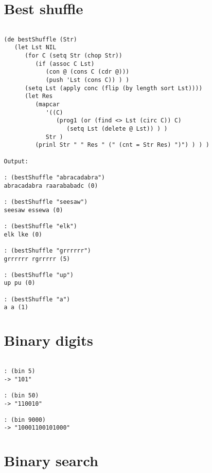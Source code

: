 \section*{Best shuffle}

\begin{verbatim}

(de bestShuffle (Str)
   (let Lst NIL
      (for C (setq Str (chop Str))
         (if (assoc C Lst)
            (con @ (cons C (cdr @)))
            (push 'Lst (cons C)) ) )
      (setq Lst (apply conc (flip (by length sort Lst))))
      (let Res
         (mapcar
            '((C)
               (prog1 (or (find <> Lst (circ C)) C)
                  (setq Lst (delete @ Lst)) ) )
            Str )
         (prinl Str " " Res " (" (cnt = Str Res) ")") ) ) )

Output:

: (bestShuffle "abracadabra")
abracadabra raarababadc (0)

: (bestShuffle "seesaw")
seesaw essewa (0)

: (bestShuffle "elk")
elk lke (0)

: (bestShuffle "grrrrrr")
grrrrrr rgrrrrr (5)

: (bestShuffle "up")
up pu (0)

: (bestShuffle "a")
a a (1)

\end{verbatim}

\section*{Binary digits}

\begin{verbatim}

: (bin 5)
-> "101"

: (bin 50)
-> "110010"

: (bin 9000)
-> "10001100101000"

\end{verbatim}

\section*{Binary search}


